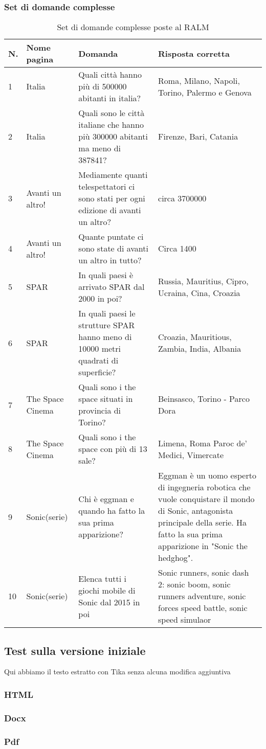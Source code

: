 \subsubsection{Set di domande complesse}
\begin{table}[H]
    \centering
    \begin{tabular}{|p{0.5cm} |p{2.5cm} |p{4cm}| p{4.5cm}|}
        \hline
        \textbf{N}. & \textbf{Nome pagina} & \textbf{Domanda} & \textbf{Risposta corretta} \\
        \hline
        1 & Italia & Quali città hanno più di 500000 abitanti in italia? & Roma, Milano, Napoli, Torino, Palermo e Genova \\
        \hline
        2 & Italia & Quali sono le città italiane che hanno più 300000 abitanti ma meno di 387841? & Firenze, Bari, Catania \\
        \hline
        3 & Avanti un altro! & Mediamente quanti telespettatori ci sono stati per ogni edizione di avanti un altro? & circa 3700000 \\
        \hline
        4 & Avanti un altro! & Quante puntate ci sono state di avanti un altro in tutto? & Circa 1400 \\
        \hline
        5 & SPAR & In quali paesi è arrivato SPAR dal 2000 in poi? & Russia, Mauritius, Cipro, Ucraina, Cina, Croazia \\
        \hline
        6 & SPAR & In quali paesi le strutture SPAR hanno meno di 10000 metri quadrati di superficie? & Croazia, Mauritious, Zambia,  India, Albania \\
        \hline
        7 & The Space Cinema & Quali sono i the space situati in provincia di Torino? & Beinsasco, Torino - Parco Dora \\
        \hline
        8 & The Space Cinema & Quali sono i the space con più di 13 sale? & Limena, Roma Paroc de' Medici,  Vimercate \\
        \hline
        9 & Sonic(serie) & Chi è eggman e quando ha fatto la sua prima apparizione? & Eggman è un uomo esperto di ingegneria robotica che vuole conquistare il mondo di Sonic, antagonista principale della serie. Ha fatto la sua prima apparizione in "Sonic the hedghog". \\
        \hline
        10 & Sonic(serie) & Elenca tutti i giochi mobile di Sonic dal 2015 in poi & Sonic runners, sonic dash 2: sonic boom, sonic runners adventure, sonic forces speed battle, sonic speed simulaor \\
        \hline
    \end{tabular}
    \caption{Set di domande complesse poste al RALM}
\end{table}

\subsection{Test sulla versione iniziale}
Qui abbiamo il testo estratto con Tika senza alcuna modifica aggiuntiva

\subsubsection{HTML}

\subsubsection{Docx}
\subsubsection{Pdf}

